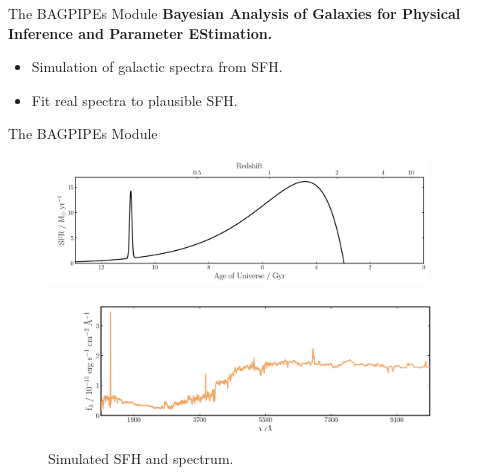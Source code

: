 \documentclass{beamer}
\begin{document}
\begin{frame}{The BAGPIPEs Module}
  \textbf{Bayesian Analysis of Galaxies for Physical Inference and Parameter EStimation.}
  \vspace{0.5in}
  \begin{itemize}
    \item Simulation of galactic spectra from SFH.
    \item Fit real spectra to plausible SFH.
  \end{itemize}
\end{frame}

\begin{frame}{The BAGPIPEs Module}
  \begin{figure}
    \centering
    \includegraphics[width=0.9\textwidth]{model020_sfh}
    \includegraphics[width=\textwidth]{model020_spectrum}
    \caption{Simulated SFH and spectrum.}
  \end{figure}
\end{frame}
\end{document}
